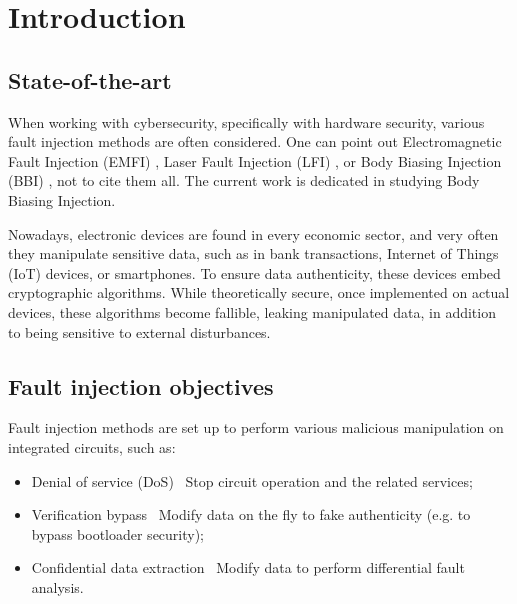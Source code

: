 
\section{Introduction}

\subsection{State-of-the-art}
	When working with cybersecurity, specifically with hardware security, various fault injection methods are often considered.
	One can point out Electromagnetic Fault Injection (EMFI) \cite{bibid}, Laser Fault Injection (LFI) \cite{bibid}, or Body Biasing Injection (BBI) \cite{bibid}, not to cite them all.
	The current work is dedicated in studying Body Biasing Injection.

	Nowadays, electronic devices are found in every economic sector, and very often they manipulate sensitive data, such as in bank transactions, Internet of Things (IoT) devices, or smartphones.
	To ensure data authenticity, these devices embed cryptographic algorithms.
	While theoretically secure, once implemented on actual devices, these algorithms become fallible, leaking manipulated data, in addition to being sensitive to external disturbances.

\subsection{Fault injection objectives}
	Fault injection methods are set up to perform various malicious manipulation on integrated circuits, such as:
	\begin{itemize}
		\item Denial of service (DoS) \textrightarrow\ Stop circuit operation and the related services;
		\item Verification bypass \textrightarrow\ Modify data on the fly to fake authenticity (e.g. to bypass bootloader security);
		\item Confidential data extraction \textrightarrow\ Modify data to perform differential fault analysis.
	\end{itemize}
